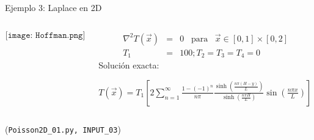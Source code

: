 \documentclass[handout]{beamer}
\newcommand{\Vector}[1]{\vec{#1}}
\begin{document}
\begin{frame}{Ejemplo 3: Laplace en 2D}


{\footnotesize
		\begin{columns}
			\begin{column}{0.3\textwidth}
				$$\texttt{[image: Hoffman.png]}$$
			\end{column}
			\begin{column}{0.7\textwidth}
				\begin{eqnarray*}
					\nabla^2 T(\vec{x}) & = & 0 \,\,\,\,\, \text{para} \,\,\,\,\, \vec{x} \in [0,1] \times [0,2] \\
					T_1 & = & 100; T_2 = T_3 = T_4 = 0 
				\end{eqnarray*}
				Soluci\'on exacta: 
				
				$\displaystyle 
				T(\vec{x}) = T_1 \left[ 
				2\sum_{n=1}^{\infty} \frac{1-(-1)^n}{n \pi} 
				\frac{\sinh \left( \frac{n \pi (H-y)}{L} \right)}
				{\sinh \left( \frac{n \pi H}{L} \right)} 
				\sin \left( \frac{n \pi x}{L} \right)
				\right]
				$
			\end{column}
		\end{columns}

(\texttt{Poisson2D\_01.py, INPUT\_03})
}


%

\end{frame}
\end{document}
